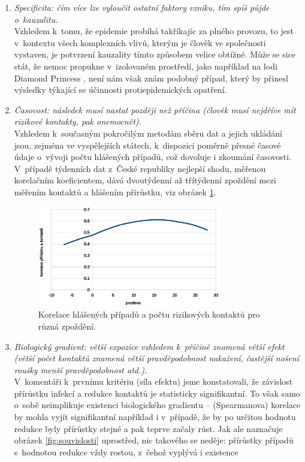 \begin{enumerate}
\item \emph{Specificita: čím více lze vyloučit ostatní faktory vzniku, tím
spíš půjde o~kauzalitu.}\\
Vzhledem k~tomu, že epidemie probíhá takříkajíc za plného provozu,
to jest v~kontextu všech komplexních vlivů, kterým je člověk ve společnosti
vystaven, je potvrzení kauzality tímto způsobem velice obtížné.
Může se sice stát, že nemoc propukne v~izolovaném prostředí, jako
například na lodi Diamond Princess \cite{mizumoto2020transmission},
není nám však znám podobný případ, který by přinesl výsledky týkající
se účinnosti protiepidemických opatření. 
\item \emph{Časovost: následek musí nastat později než příčina (člověk musí
nejdříve mít rizikové kontakty, pak onemocnět).}\\
Vzhledem k~současným pokročilým metodám sběru dat a jejich ukládání
jsou, zejména ve vyspělejších státech, k~dispozici poměrně přesné
časové údaje o~vý\-vo\-ji počtu hlášených případů, což dovoluje i zkoumání časovosti.
V~případě tý\-den\-ních dat z~České republiky nejlepší shodu, měřenou
korelačním koeficientem, dává dvoutýdenní až třítýdenní zpoždění mezi měřením
kon\-tak\-tů a hlášením pří\-růst\-ku, viz obrázek \ref{fig:korelace}.
\begin{figure}
\begin{center}
\includegraphics[width=8cm]{pic/lagsel.eps}
\caption{Korelace hlášených případů a počtu rizikových kontaktů pro různá zpoždění.}
\label{fig:korelace}
\end{center}
\end{figure}
\item \emph{Biologický gradient: větší expozice vzhledem k~příčině znamená
větší efekt (větší počet kontaktů znamená větší pravděpodobnost nakažení,
častější nošení roušky menší pravděpodobnost atd.).}\\
V~komentáři k~prvnímu kritériu (síla efektu) jsme konstatovali, že závislost přírůstku infekcí a redukce kontaktů je statisticky signifikantní. To však samo o~sobě neimplikuje existenci biologického gradientu -- (Spearmanova) korelace by mohla vyjít signifikantní například i v~případě, že by po určitou hodnotu redukce byly přírůstky stejné a pak teprve začaly růst. Jak ale naznačuje obrázek \ref{fig:souvislosti} uprostřed, nic takového se neděje: přírůstky případů s~hodnotou redukce vždy rostou, z~čehož vyplývá i existence

\end{enumerate}

